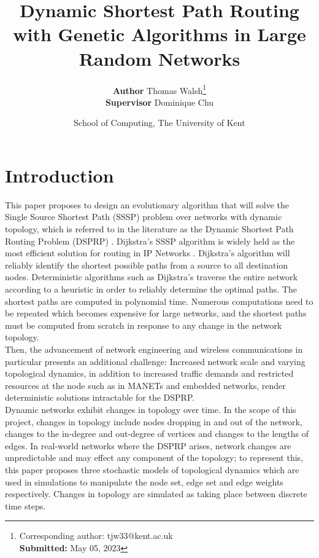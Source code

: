 \documentclass[
	a4paper, %
	10pt, %
	unnumberedsections, %
	twoside, %
]{LTJournalArticle}
\title{Dynamic Shortest Path Routing with Genetic Algorithms in Large Random Networks} %
\author{%
	\textbf{Author} Thomas Walsh\thanks{Corresponding author: {tjw33@kent.ac.uk}\\ \textbf{Submitted:} May 05, 2023}\\ \textbf{Supervisor} Dominique Chu}
\date{\footnotesize{School of Computing, The University of Kent}\\}
\begin{document}
\maketitle %


\section{Introduction}

This paper proposes to design an evolutionary algorithm that will solve the Single Source Shortest Path (SSSP) problem over networks with dynamic topology, which is referred to in the literature as the Dynamic Shortest Path Routing Problem (DSPRP) \cite{yang:10}. Dijkstra's SSSP algorithm is widely held as the most efficient solution for routing in IP Networks \cite{kumar:10}. Dijkstra's algorithm will reliably identify the shortest possible paths from a source to all destination nodes. Deterministic algorithms such as Dijkstra's traverse the entire network according to a heuristic in order to reliably determine the optimal paths. The shortest paths are computed in polynomial time. Numerous computations need to be repeated which becomes expensive for large networks, and the shortest paths must be computed from scratch in response to any change in the network topology. \\

Then, the advancement of network engineering and wireless communications in particular \cite{yang:10} presents an additional challenge: Increased network scale and varying topological dynamics, in addition to increased traffic demands and restricted resources at the node such as in MANETs and embedded networks, render deterministic solutions intractable for the DSPRP. \\ 

Dynamic networks exhibit changes in topology over time. In the scope of this project, changes in topology include nodes dropping in and out of the network, changes to the in-degree and out-degree of vertices and changes to the lengths of edges. In real-world networks where the DSPRP arises, network changes are unpredictable and may effect any component of the topology; to represent this, this paper proposes three stochastic models of topological dynamics which are used in simulations to manipulate the node set, edge set and edge weights respectively. Changes in topology are simulated as taking place between discrete time steps. \\
\end{document}
